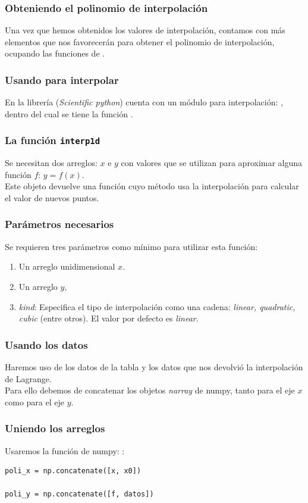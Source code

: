 \documentclass[12pt]{beamer}
\begin{document}
\begin{frame}
\frametitle{Obteniendo el polinomio de interpolación}
Una vez que hemos obtenidos los valores de interpolación, contamos con más elementos que nos favorecerán para obtener el polinomio de interpolación, ocupando las funciones de \python.
\end{frame}
\begin{frame}
\frametitle{Usando \python{} para interpolar}
En la librería  (\textit{Scientific python}) cuenta con un módulo para interpolación: \pause {}, dentro del cual se tiene la función \pause {}.
\end{frame}
\begin{frame}
\frametitle{La función \texttt{interp1d}}
Se necesitan dos arreglos: $x$ e $y$ con valores que se utilizan para aproximar alguna función $f: \, y = f (x)$.
\\
\bigskip
\pause
Este objeto devuelve una función cuyo método usa la interpolación para calcular el valor de nuevos puntos.
\end{frame}
\begin{frame}
\frametitle{Parámetros necesarios}
Se requieren tres parámetros como mínimo para utilizar esta función:
\pause
{}
\begin{enumerate}[<+->]
\item Un arreglo unidimensional $x$.
\item Un arreglo $y$,
\item \textit{kind}: Especifica el tipo de interpolación como una cadena: \textit{linear, quadratic, cubic} (entre otros). El valor por defecto es \textit{linear}.
\end{enumerate}
\end{frame}
\begin{frame}
\frametitle{Usando los datos}
Haremos uso de los datos de la tabla y los datos que nos devolvió la interpolación de Lagrange.
\\
\bigskip
\pause
Para ello debemos de concatenar los objetos \textit{narray} de numpy, tanto para el eje $x$ como para el eje $y$.
\end{frame}
\begin{frame}[fragile]
\frametitle{Uniendo los arreglos}
Usaremos la función de numpy: :
\begin{lstlisting}[caption=Uniendo los arreglos]
poli_x = np.concatenate([x, x0])

poli_y = np.concatenate([f, datos])
\end{lstlisting}
\end{frame}
\end{document}
